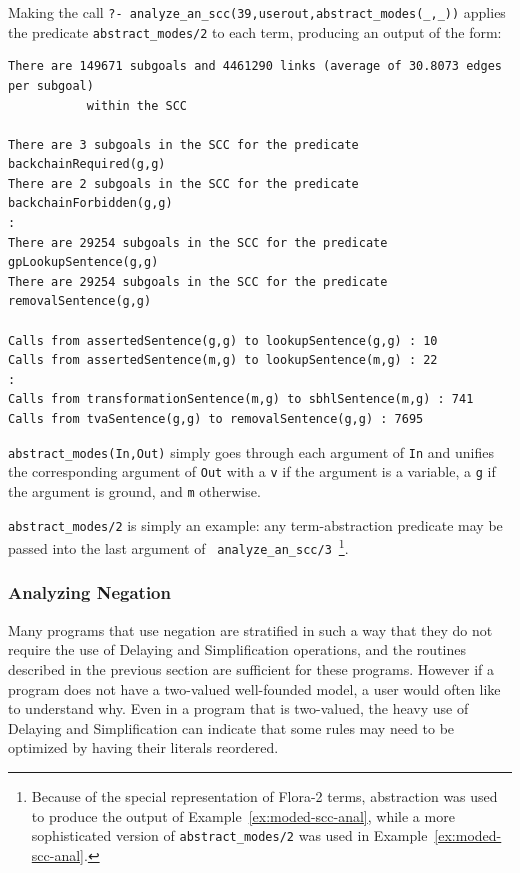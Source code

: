 \begin{example} \label{ex:moded-scc-anal} \rm
%
Making the call {\tt ?-
  analyze\_an\_scc(39,userout,abstract\_modes(\_,\_))} applies the
predicate {\tt abstract\_modes/2} to each term, producing an output of
the form:
%
\begin{verbatim}
There are 149671 subgoals and 4461290 links (average of 30.8073 edges per subgoal) 
           within the SCC

There are 3 subgoals in the SCC for the predicate backchainRequired(g,g)
There are 2 subgoals in the SCC for the predicate backchainForbidden(g,g)
:
There are 29254 subgoals in the SCC for the predicate gpLookupSentence(g,g)
There are 29254 subgoals in the SCC for the predicate removalSentence(g,g)

Calls from assertedSentence(g,g) to lookupSentence(g,g) : 10
Calls from assertedSentence(m,g) to lookupSentence(m,g) : 22
:
Calls from transformationSentence(m,g) to sbhlSentence(m,g) : 741
Calls from tvaSentence(g,g) to removalSentence(g,g) : 7695
\end{verbatim}
%
{\tt abstract\_modes(In,Out)} simply goes through each argument of
{\tt In} and unifies the corresponding argument of {\tt Out} with a
{\tt v} if the argument is a variable, a {\tt g} if the argument is
ground, and {\tt m} otherwise.  
\end{example}
%
{\tt abstract\_modes/2} is simply an example: any term-abstraction
predicate may be passed into the last argument of {\tt
  analyze\_an\_scc/3}~\footnote{Because of the special representation
  of Flora-2 terms, abstraction was used to produce the output of
  Example~\ref{ex:moded-scc-anal}, while a more sophisticated version
  of {\tt abstract\_modes/2} was used in
  Example~\ref{ex:moded-scc-anal}.}.

\subsubsection{Analyzing Negation}
%
Many programs that use negation are stratified in such a way that they
do not require the use of {\sc Delaying} and {\sc Simplification}
operations, and the routines described in the previous section are
sufficient for these programs.  However if a program does not have a
two-valued well-founded model, a user would often like to understand
why.  Even in a program that is two-valued, the heavy use of {\sc
  Delaying} and {\sc Simplification} can indicate that some rules may
need to be optimized by having their literals reordered.

